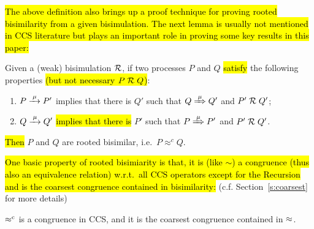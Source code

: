 \hl{The above definition also brings up a proof technique for proving rooted
bisimilarity from a given bisimulation. The next
lemma is usually not mentioned in CCS literature but plays an
important role in proving some key results in this paper:}
\begin{lemma}
\label{l:obsCongrByWeakBisim}
Given a (weak) bisimulation $\mathrel{\cal R}$, if two processes $P$ and $Q$
\hl{satisfy} the following properties \hl{(but not necessary $P\;{\cal R}\;Q$)}:
\begin{enumerate}
\item $P \arr\mu P'$ implies that there is $Q'$ such that $Q
   \Arr\mu Q'$ and $P' \mathrel{\cal R} Q'$;
\item $Q \arr\mu Q'$ \hl{implies that there is} $P'$ such that $P
   \Arr\mu P'$ and $P' \mathrel{\cal R} Q'$.
\end{enumerate}
\hl{Then} $P$ and $Q$ are rooted bisimilar, i.e.~$P \approx^c Q$.
\end{lemma}

\hl{One basic property of rooted bisimiarity is that, it is (like $\sim$)
a congruence (thus also an equivalence relation)
w.r.t.~all CCS operators except for the Recursion and is the
coarsest congruence contained in bisimilarity:}
(c.f. Section~\ref{s:coarsest} for more details)
\begin{theorem}
\label{t:rapproxCongruence}
$\mathrel{\approx^{\rm{c}}}$ is a congruence in CCS, and it is the
coarsest congruence contained in $\approx$.
\end{theorem}

